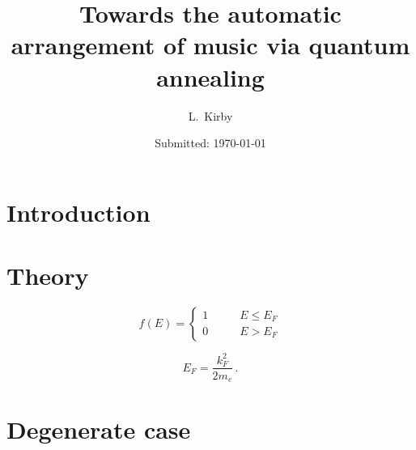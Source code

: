 \documentclass[aps,pra,10pt,twocolumn]{revtex4-2}
\begin{document}
\title{Towards the automatic arrangement of music via quantum annealing}
\author{L.\ Kirby}                              %
\date{Submitted: \today{}}     %

\begin{abstract}              

\lipsum[1]

\end{abstract}

\maketitle

\thispagestyle{plain} %

\section{Introduction} 



\section{Theory} 


\begin{equation}
    f(E)=\begin{cases}
        1\qquad & E\le E_F \\
        0\qquad & E>E_F
    \end{cases}
\end{equation}

\begin{equation}
    E_F=\frac{k_F^2}{2m_e} \,.
\end{equation}


\section{Degenerate case}

\end{document}
